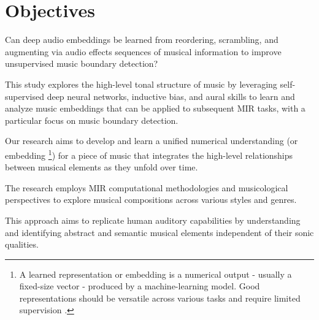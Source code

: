 \section{Objectives}

Can deep audio embeddings be learned from reordering, scrambling, and augmenting via audio effects sequences of musical information to improve unsupervised music boundary detection?

This study explores the high-level tonal structure of music by leveraging self-supervised deep neural networks, inductive bias, and aural skills to learn and analyze music embeddings that can be applied to subsequent MIR tasks, with a particular focus on music boundary detection.

Our research aims to develop and learn a unified numerical understanding (or embedding \footnote{A learned representation or embedding is a numerical output - usually a fixed-size vector - produced by a machine-learning model. Good representations should be versatile across various tasks and require limited supervision \cite{Turian2022HEAR:Representations}.}) for a piece of music that integrates the high-level relationships between musical elements as they unfold over time.

The research employs MIR computational methodologies and musicological perspectives to explore musical compositions across various styles and genres.

This approach aims to replicate human auditory capabilities by understanding and identifying abstract and semantic musical elements independent of their sonic qualities.